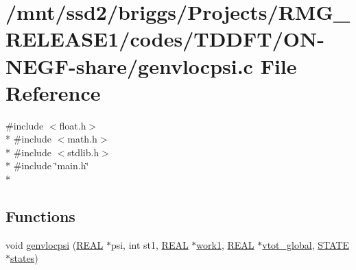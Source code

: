 \hypertarget{_t_d_d_f_t_2_o_n-_n_e_g_f-share_2genvlocpsi_8c}{\section{/mnt/ssd2/briggs/\-Projects/\-R\-M\-G\-\_\-\-R\-E\-L\-E\-A\-S\-E1/codes/\-T\-D\-D\-F\-T/\-O\-N-\/\-N\-E\-G\-F-\/share/genvlocpsi.c File Reference}
\label{_t_d_d_f_t_2_o_n-_n_e_g_f-share_2genvlocpsi_8c}
}
{\ttfamily \#include $<$float.\-h$>$}\\*
{\ttfamily \#include $<$math.\-h$>$}\\*
{\ttfamily \#include $<$stdlib.\-h$>$}\\*
{\ttfamily \#include \char`\"{}main.\-h\char`\"{}}\\*
\subsection*{Functions}
\begin{DoxyCompactItemize}
\item 
void \hyperlink{_t_d_d_f_t_2_o_n-_n_e_g_f-share_2genvlocpsi_8c_a8dc49f2e1910339ece964308223a0afd}{genvlocpsi} (\hyperlink{md_8h_a4b654506f18b8bfd61ad2a29a7e38c25}{R\-E\-A\-L} $\ast$psi, int st1, \hyperlink{md_8h_a4b654506f18b8bfd61ad2a29a7e38c25}{R\-E\-A\-L} $\ast$\hyperlink{_t_d_d_f_t_2_common_2mg__eig_8c_afa4d5695ba7e2e1cd04f9e56f0b03cd2}{work1}, \hyperlink{md_8h_a4b654506f18b8bfd61ad2a29a7e38c25}{R\-E\-A\-L} $\ast$\hyperlink{md_8h_a920e9d60b9492610c9a8ad1dfdf793f4}{vtot\-\_\-global}, \hyperlink{struct_s_t_a_t_e}{S\-T\-A\-T\-E} $\ast$\hyperlink{md_8h_a286ebf6b996d2b1827eb9a889dfc83d7}{states})
\end{DoxyCompactItemize}


